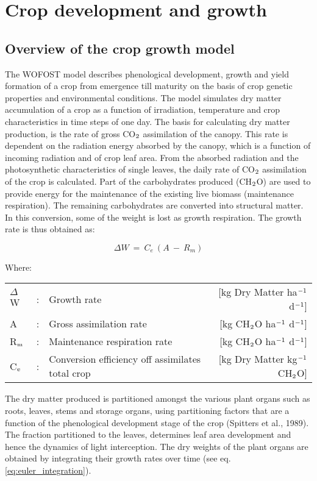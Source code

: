 \chapter{Crop development and growth}

\section{Overview of the crop growth model}

The WOFOST model describes phenological development, growth and yield formation of
a crop from emergence till maturity on the basis of crop genetic properties and 
environmental conditions. The model simulates dry matter accumulation of a crop as a function
of irradiation, temperature and crop characteristics in time steps of one day. 
The basis for calculating dry matter production, is the rate of gross CO$_{{\rm 2}}$ assimilation of
the canopy. This rate is dependent on the radiation energy absorbed by the canopy, which
is a function of incoming radiation and of crop leaf area. From the absorbed radiation and
the photosynthetic characteristics of single leaves, the daily rate of CO$_{{\rm 2}}$ assimilation of the
crop is calculated. Part of the carbohydrates produced (CH$_{{\rm 2}}$O) are used to provide energy
for the maintenance of the existing live biomass (maintenance respiration). The remaining
carbohydrates are converted into structural matter. In this conversion, some of the weight
is lost as growth respiration. The growth rate is thus obtained as:

\begin{equation}
\Delta W ~=~ C _{e} ~( A ~-~ R _{m} )
\end{equation}

Where:\\[5pt]
\begin{tabularx}{\textwidth}{llXr}
	$\Delta$W &:& Growth rate    &   
	[kg Dry Matter ha$^{{\rm -1}}$ d$^{{\rm -1}}$]\\
	A  &:& Gross assimilation   rate &  
	[kg CH$_{{\rm 2}}$O ha$^{{\rm -1}}$ d$^{{\rm -1}}$]\\
	R$_{{\rm m}}$  &:& Maintenance respiration rate    &  
	[kg CH$_{{\rm 2}}$O ha$^{{\rm -1}}$ d$^{{\rm -1}}$]\\
	C$_{{\rm e}}$ &:& Conversion efficiency off assimilates total crop   &   
	[kg Dry Matter kg$^{{\rm -1}}$ CH$_{{\rm 2}}$O]\\
\end{tabularx}

The dry matter produced is partitioned amongst the various plant organs such as roots,
leaves, stems and storage organs, using partitioning factors that are a function of the
phenological development stage of the crop (Spitters et al., 1989). The fraction partitioned
to the leaves, determines leaf area development and hence the dynamics of light interception. 
The dry weights of the plant organs are obtained by integrating their growth rates
over time (see eq. \ref{eq:euler_integration}).

